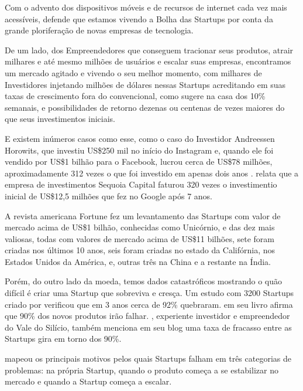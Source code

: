 Com o advento dos dispositivos móveis e de recursos de internet cada vez mais acessíveis,  defende que estamos vivendo a Bolha das Startups por conta da grande ploriferação de novas empresas de tecnologia. 

De um lado, dos Empreendedores que conseguem tracionar seus produtos, atrair milhares e até mesmo milhões de usuários e escalar suas empresas, encontramos um mercado agitado e vivendo o seu melhor momento, com milhares de Investidores injetando milhões de dólares nessas Startups acreditando em suas taxas de crescimento fora do convencional, como  sugere na casa dos 10\% semanais, e possibilidades de retorno dezenas ou centenas de vezes maiores do que seus investimentos iniciais.

E existem inúmeros casos como esse, como o caso do Investidor Andreessen Horowits, que investiu US\$250 mil no início do Instagram e, quando ele foi vendido por US\$1 bilhão para o Facebook, lucrou cerca de US\$78 milhões, aproximadamente 312 vezes o que foi investido em apenas dois anos .  relata que a empresa de investimentos Sequoia Capital faturou 320 vezes o investimentio inicial de US\$12,5 milhões que fez no Google após 7 anos.

A revista americana Fortune fez um levantamento das Startups com valor de mercado acima de US\$1 bilhão, conhecidas como Unicórnio, e das dez mais valiosas, todas com valores de mercado acima de US\$11 bilhões, sete foram criadas nos últimos 10 anos, seis foram criadas no estado da Califórnia, nos Estados Unidos da América, e, outras três na China e a restante na Índia.

Porém, do outro lado da moeda, temos dados catastróficos mostrando o quão difícil é criar uma Startup que sobreviva e cresça. Um estudo com 3200 Startups criado por  verificou que em 3 anos cerca de 92\% quebraram.  em seu livro afirma que 90\% dos novos produtos irão falhar. , experiente investidor e empreendedor do Vale do Silício, também menciona em seu blog uma taxa de fracasso entre as Startups gira em torno dos 90\%. 

 mapeou os principais motivos pelos quais Startups falham em três categorias de problemas: na própria Startup, quando o produto começa a se estabilizar no mercado e quando a Startup começa a escalar.

